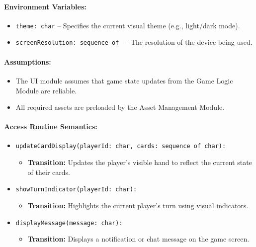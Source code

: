 \documentclass[12pt, titlepage]{article}
\begin{document}
\paragraph{Environment Variables:}
\begin{itemize}
    \item \texttt{theme: char} -- Specifies the current visual theme (e.g., light/dark mode).
    \item \texttt{screenResolution: sequence of } -- The resolution of the device being used.
\end{itemize}

\paragraph{Assumptions:}
\begin{itemize}
    \item The UI module assumes that game state updates from the Game Logic Module are reliable.
    \item All required assets are preloaded by the Asset Management Module.
\end{itemize}

\paragraph{Access Routine Semantics:}
\begin{itemize}
    \item \texttt{updateCardDisplay(playerId: char, cards: sequence of char):}
    \begin{itemize}
        \item \textbf{Transition:} Updates the player’s visible hand to reflect the current state of their cards.
    \end{itemize}
    \item \texttt{showTurnIndicator(playerId: char):}
    \begin{itemize}
        \item \textbf{Transition:} Highlights the current player's turn using visual indicators.
    \end{itemize}
    \item \texttt{displayMessage(message: char):}
    \begin{itemize}
        \item \textbf{Transition:} Displays a notification or chat message on the game screen.
    \end{itemize}
\end{itemize}
\end{document}
